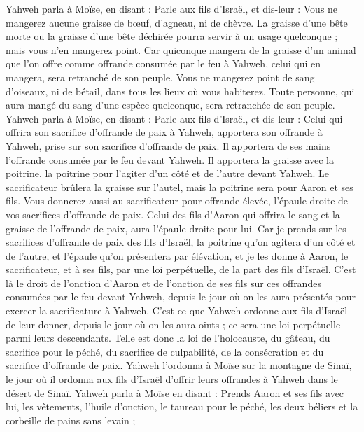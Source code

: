 \begin{multicols}{2}
Yahweh parla à Moïse, en disant :
Parle aux fils d'Israël, et dis-leur : Vous ne mangerez aucune graisse de bœuf, d'agneau, ni de chèvre.
La graisse d’une bête morte ou la graisse d’une bête déchirée pourra servir à un usage quelconque ; mais vous n'en mangerez point.
Car quiconque mangera de la graisse d’un animal que l’on offre comme offrande consumée par le feu à Yahweh, celui qui en mangera, sera retranché de son peuple.
Vous ne mangerez point de sang d'oiseaux, ni de bétail, dans tous les lieux où vous habiterez.
Toute personne, qui aura mangé du sang d’une espèce quelconque, sera retranchée de son peuple.
Yahweh parla à Moïse, en disant :
Parle aux fils d'Israël, et dis-leur : Celui qui offrira son sacrifice d’offrande de paix à Yahweh, apportera son offrande à Yahweh, prise sur son sacrifice d’offrande de paix.
Il apportera de ses mains l’offrande consumée par le feu devant Yahweh. Il apportera la graisse avec la poitrine, la poitrine pour l’agiter d’un côté et de l’autre devant Yahweh.
Le sacrificateur brûlera la graisse sur l'autel, mais la poitrine sera pour Aaron et ses fils.
Vous donnerez aussi au sacrificateur pour offrande élevée, l’épaule droite de vos sacrifices d’offrande de paix.
Celui des fils d'Aaron qui offrira le sang et la graisse de l’offrande de paix, aura l’épaule droite pour lui.
Car je prends sur les sacrifices d’offrande de paix des fils d'Israël, la poitrine qu’on agitera d’un côté et de l’autre, et l'épaule qu’on présentera par élévation, et je les donne à Aaron, le sacrificateur, et à ses fils, par une loi perpétuelle, de la part des fils d'Israël.
C'est là le droit de l'onction d'Aaron et de l'onction de ses fils sur ces offrandes consumées par le feu devant Yahweh, depuis le jour où on les aura présentés pour exercer la sacrificature à Yahweh.
C’est ce que Yahweh ordonne aux fils d'Israël de leur donner, depuis le jour où on les aura oints ; ce sera une loi perpétuelle parmi leurs descendants.
Telle est donc la loi de l'holocauste, du gâteau, du sacrifice pour le péché, du sacrifice de culpabilité, de la consécration et du sacrifice d’offrande de paix.
Yahweh l’ordonna à Moïse sur la montagne de Sinaï, le jour où il ordonna aux fils d'Israël d'offrir leurs offrandes à Yahweh dans le désert de Sinaï.
\VerseOne{}Yahweh parla à Moïse en disant :
Prends Aaron et ses fils avec lui, les vêtements, l'huile d'onction, le taureau pour le péché, les deux béliers et la corbeille de pains sans levain ;

\end{multicols}
